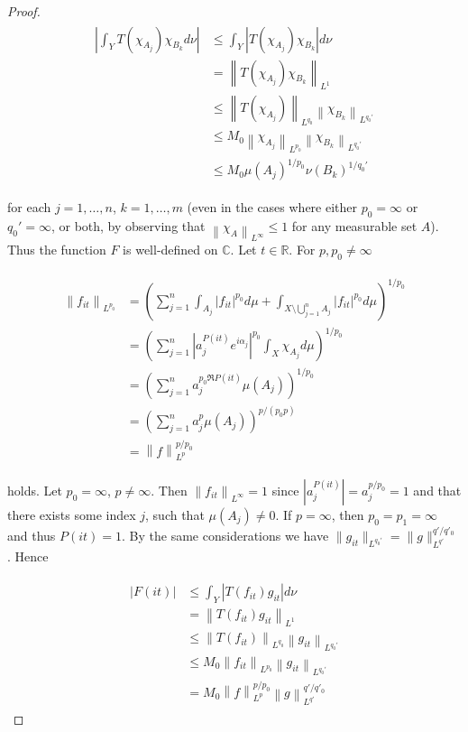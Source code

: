 \begin{proof}
\begin{gather}
	\begin{aligned}
		\left| \int_YT(\chi_{A_j})\chi_{B_k}d\nu \right| &\leqslant \int_Y\left| T(\chi_{A_j})\chi_{B_k}\right|d\nu\\
		&= \left\|T(\chi_{A_j})\chi_{B_k}\right\|_{L^1}\\
		&\leqslant \left\|T(\chi_{A_j})\right\|_{L^{q_0}} \left\|\chi_{B_k}\right\|_{L^{q_0'}}\\
		&\leqslant M_0\left\|\chi_{A_j}\right\|_{L^{p_0}} \left\|\chi_{B_k}\right\|_{L^{q_0'}}\\
		&\leqslant M_0 \mu\left(A_j\right)^{1/p_0}\nu\left(B_k\right)^{1/q_0'}
	\end{aligned}
	\label{est:constant_F}
\end{gather}

for each $j = 1,\hdots,n$, $k = 1,\hdots,m$ (even in the cases where either $p_0 = \infty$ or $q_0' = \infty$, or both, by observing that $\left\| \chi_{A}\right\|_{L^\infty} \leqslant 1$ for any measurable set $A$). Thus the function $F$ is well-defined on $\mathbb{C}$. Let $t \in \mathbb{R}$. For $p,p_0 \neq \infty$

\begin{gather*}
	\begin{aligned}
		\left\|f_{it}\right\|_{L^{p_0}} &= \left(\sum_{j = 1}^n \int_{A_j} \left| f_{it} \right|^{p_0} d\mu + \int_{X \setminus \bigcup_{j = 1}^n A_j} \left| f_{it} \right|^{p_0} d\mu\right)^{1/p_0}\\
		&= \left(\sum_{j = 1}^n \left| a_j^{P(it)} e^{i\alpha_j}\right|^{p_0}\int_X \chi_{A_j} d\mu\right)^{1/p_0}\\
		&= \left(\sum_{j = 1}^n a_j^{p_0\Re P(it)}\mu\left(A_j\right)\right)^{1/p_0}\\
		&= \left(\sum_{j = 1}^n a_j^p\mu\left(A_j\right)\right)^{p/\left(p_0p\right)}\\
		&= \left\|f\right\|_{L^p}^{p/p_0} 
	\end{aligned}
\end{gather*}

holds. Let $p_0 = \infty$, $p \neq \infty$. Then $\left\|f_{it}\right\|_{L^{\infty}} = 1$ since $\left| a_j^{P(it)}\right| = a_j^{p/p_0} = 1$ and that there exists some index $j$, such that $\mu\left( A_j \right) \neq 0$. If $p = \infty$, then $p_0 = p_1 = \infty$ and thus $P(it) = 1$. By the same considerations we have $\|g_{it}\|_{L^{q_0'}} = \|g\|_{L^{q'}}^{q'/q'_0}$. Hence

\begin{gather*}
	\begin{aligned}
		\left| F(it) \right| &\leqslant \int_Y \left| T(f_{it})g_{it}\right| d\nu\\
		&= \left\|T(f_{it}) g_{it}\right\|_{L^1}\\
		&\leqslant \left\|T(f_{it})\right\|_{L^{q_0}}\left\|g_{it}\right\|_{L^{q_0'}}\\
		&\leqslant M_0 \left\|f_{it}\right\|_{L^{p_0}} \left\|g_{it}\right\|_{L^{q_0'}}\\
		&= M_0 \left\|f\right\|_{L^p}^{p/p_0} \left\|g\right\|_{L^{q'}}^{q'/q'_0}
	\end{aligned}
\end{gather*}


\end{proof}
